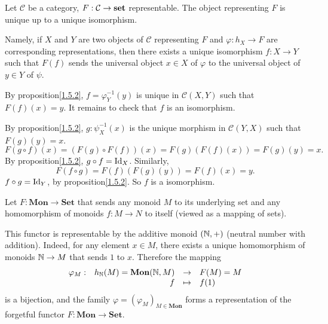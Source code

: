 \begin{corollaryenv}
    Let $\mathcal{C}$ be a category, $F:\mathcal{C}\rightarrow \mathbf{set}$ representable.
    The object representing $F$ is unique up to a unique isomorphism.
    
    \quad Namely, if $X$ and $Y$ are two objects of $\mathcal{C}$ representing $F$ and $\varphi:h_X\rightarrow F$ are corresponding representations, then there exists a unique isomorphism $f:X\rightarrow Y$ such that $F(f)$ sends the universal object $x\in X$ of $\varphi$ to the universal object of $y\in Y$ of $\psi$.
\end{corollaryenv}
\begin{proofenv}
    By proposition\ref{1.5.2}, $f = \varphi_Y^{-1}(y)$ is unique in $\mathcal{C}(X,Y)$ such that $F(f)(x) = y$. It remains to check that $f$ is an isomorphism. 
    
    \quad By proposition\ref{1.5.2}, $g:\psi^{-1}_{X}(x)$ is the unique morphism in $\mathcal{C}(Y,X)$ such that $F(g)(y) = x$.
    $$
    F\left(g\circ f\right)(x) = \left(F(g)\circ F(f)\right)(x) = F(g)\left(F(f)(x)\right) = F(g)(y) = x.
    $$
    By proposition\ref{1.5.2}, $g\circ f = \operatorname{\mathrm{Id}}_X$. Similarly, 
    $$
    F\left(f\circ g\right) = F(f)\left(F(g)(y)\right) = F(f)(x) = y.
    $$
    $f\circ g = \operatorname{\mathrm{Id}}_Y$, by proposition\ref{1.5.2}. So $f$ is a isomorphism.
\end{proofenv}
\begin{exampleenv}
    Let $F:\mathbf{Mon}\rightarrow\mathbf{Set}$ that sends any monoid $M$ to its underlying set and any homomorphism of monoids $f:M\rightarrow N$ to itself (viewed as a mapping of sets).

    \quad This functor is representable by the additive monoid $(\mathbb{N},+)$ (neutral number with addition). Indeed, for any element $x\in M$, there exists a unique homomorphism of monoids $\mathbb{N}\rightarrow M$ that sends $1$ to $x$. Therefore the mapping
    $$ \begin{array}{rrcl}
        \varphi_{M} :& h_{\mathbb{N}}(M) = \mathbf{Mon}(\mathbb{N},M) &\rightarrow & F(M) = M\\
        & f & \mapsto &f(1)
    \end{array}
    $$
    is a bijection, and the family $\varphi = \left(\varphi_M\right)_{M\in \mathbf{Mon}}$ forms a representation of the forgetful functor $F:\mathbf{Mon} \rightarrow\mathbf{Set}$.
\end{exampleenv}
